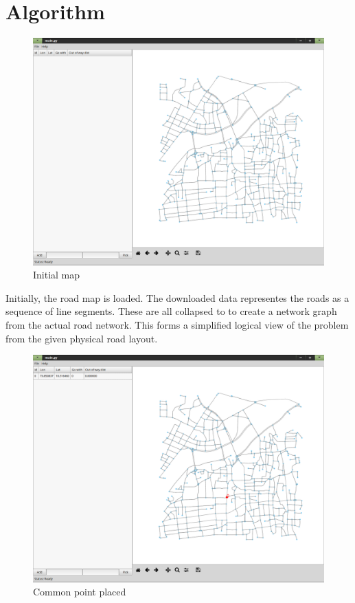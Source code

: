\documentclass[main.tex]{subfiles}
\begin{document}
\section{Algorithm}

\begin{figure}[htpb]
  \centering
  \includegraphics[width=0.8\linewidth]{scr_1.png}
  \caption{Initial map}
  \label{fig:scr1}
\end{figure}

Initially, the road map is loaded. The downloaded data representes the roads as
a sequence of line segments. These are all collapsed to to create a network
graph from the actual road network. This forms a simplified logical view of the
problem from the given physical road layout.


\begin{figure}[htpb]
  \centering
  \includegraphics[width=0.8\linewidth]{scr_2.png}
  \caption{Common point placed}
  \label{fig:scr2}
\end{figure}
\end{document}
